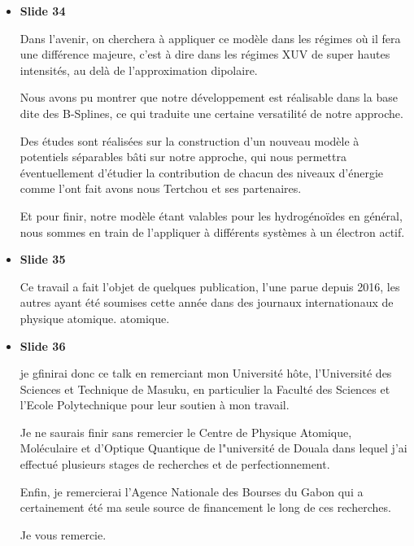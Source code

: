 \documentclass[10pt,a4paper]{article}
\begin{document}
\begin{itemize}
Nous nous omme ensuite assur\'es d'une coh\'erence interne de
nos r\'esultats en \'evaluant nos observables par diff\'erentes techniques 
avant de les confronter aux autres r\'esultats pr\'esenmts dans la litt\'erarture.
Nous obtenons d'excellents r\'esultats jusqu'\`a pr\'esent.

\item \textbf{Slide 34}\par
Dans l'avenir, 
on cherchera \`a appliquer ce mod\`ele dans les r\'egimes 
o\`u il fera une diff\'erence majeure, c'est \`a dire dans les r\'egimes
XUV de super hautes intensit\'es, au del\`a de l'approximation dipolaire.  

Nous avons pu montrer que notre d\'eveloppement est r\'ealisable 
dans la base dite des B-Splines, ce qui traduite une certaine 
versatilit\'e de notre approche.

Des \'etudes sont r\'ealis\'ees sur la construction 
d'un nouveau mod\`ele \`a potentiels s\'eparables b\^ati sur notre approche, 
qui nous permettra \'eventuellement d'\'etudier la contribution de chacun des niveaux 
d'\'energie comme l'ont fait avons nous Tertchou et ses partenaires.

Et pour finir, notre mod\`ele \'etant valables pour les hydrog\'eno\"ides 
en g\'en\'eral, nous sommes en train de l'appliquer \`a diff\'erents
syst\`emes \`a un \'electron actif.


\item \textbf{Slide 35}\par
Ce travail a fait l'objet de quelques publication, l'une parue depuis 2016,
les autres ayant \'et\'e soumises cette ann\'ee 
dans des journaux internationaux de physique atomique.
atomique. 

\item \textbf{Slide 36}\par
je gfinirai donc ce talk en remerciant mon Universit\'e h\^ote, 
l'Universit\'e des Sciences et Technique de Masuku, 
en particulier la Facult\'e des Sciences et l'Ecole Polytechnique 
pour leur soutien \`a mon travail.

Je ne saurais finir sans remercier le Centre de Physique Atomique, 
Mol\'eculaire et d'Optique Quantique de l"universit\'e de Douala dans lequel 
j'ai effectu\'e plusieurs stages de recherches et de perfectionnement.

Enfin, je remercierai l'Agence Nationale des Bourses du Gabon 
qui a certainement \'et\'e ma seule source de financement le long de ces recherches.

Je vous remercie.
\end{itemize}
\end{document}
